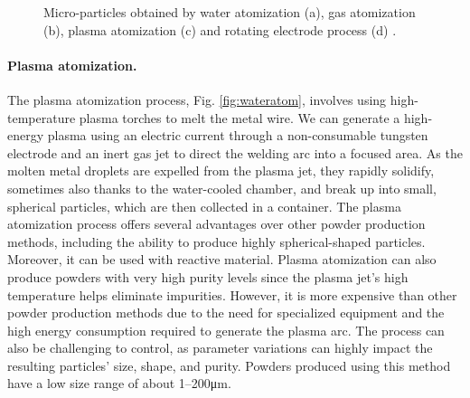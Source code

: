 \begin{figure}
{    }
    \qquad
    
    \caption[Powders obtained from atomization processes.]{Micro-particles obtained by water atomization (a), gas atomization (b), plasma atomization (c) and rotating electrode process (d) \cite{slotwinski_characterization_2014}.}
    \label{fig:powders}
\end{figure}
\paragraph{Plasma atomization.} The plasma atomization process, Fig. \ref{fig:wateratom}, involves using high-temperature plasma torches to melt the metal wire. We can generate a high-energy plasma using an electric current through a non-consumable tungsten electrode and an inert gas jet to direct the welding arc into a focused area. As the molten metal droplets are expelled from the plasma jet, they rapidly solidify, sometimes also thanks to the water-cooled chamber, and break up into small, spherical particles, which are then collected in a container. The plasma atomization process offers several advantages over other powder production methods, including the ability to produce highly spherical-shaped particles. Moreover, it can be used with reactive material. Plasma atomization can also produce powders with very high purity levels since the plasma jet's high temperature helps eliminate impurities. However, it is more expensive than other powder production methods due to the need for specialized equipment and the high energy consumption required to generate the plasma arc. The process can also be challenging to control, as parameter variations can highly impact the resulting particles' size, shape, and purity. Powders produced using this method have a low size range of about \numrange[range-phrase = --]{1}{200}\unit{\micro\metre}.
